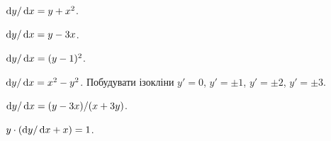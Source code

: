 \begin{problem}
	$\mathop{}\!\mathrm{d} y / \mathop{}\!\mathrm{d} x = y + x^2$.
\end{problem}

\begin{problem}
	$\mathop{}\!\mathrm{d} y / \mathop{}\!\mathrm{d} x = y - 3 x$.
\end{problem}

\begin{problem}
	$\mathop{}\!\mathrm{d} y / \mathop{}\!\mathrm{d} x = (y - 1)^2$.
\end{problem}

\begin{problem}
	$\mathop{}\!\mathrm{d} y / \mathop{}\!\mathrm{d} x = x^2 - y^2$. Побудувати ізокліни $y' = 0$, $y' = \pm 1$, $y' = \pm 2$, $y' = \pm 3$.
\end{problem}

\begin{problem}
	$\mathop{}\!\mathrm{d} y / \mathop{}\!\mathrm{d} x = (y - 3x) / (x + 3y)$.
\end{problem}

\begin{problem}
	$y \cdot (\mathop{}\!\mathrm{d} y / \mathop{}\!\mathrm{d} x + x) = 1$.
\end{problem}
